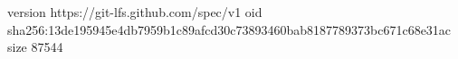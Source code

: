 version https://git-lfs.github.com/spec/v1
oid sha256:13de195945e4db7959b1c89afcd30c73893460bab8187789373bc671c68e31ac
size 87544
